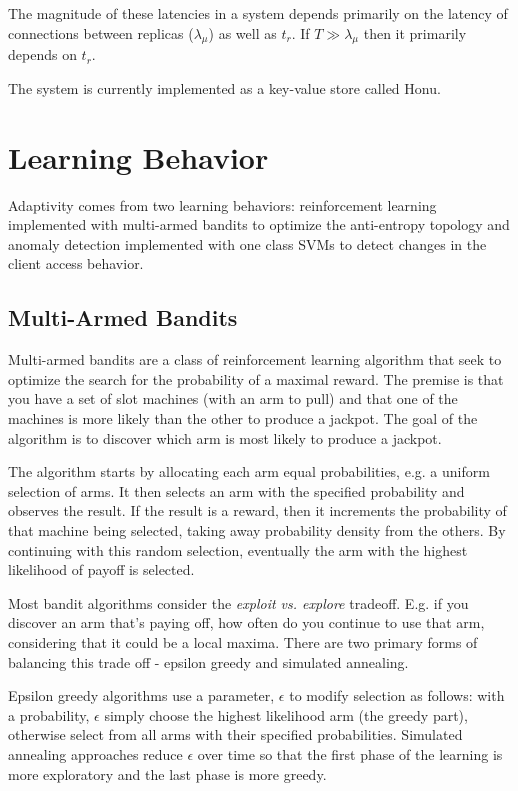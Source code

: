 \documentclass[letterpaper,11pt,onecolumn]{article}
\begin{document}
The magnitude of these latencies in a system depends primarily on the latency
of connections between replicas ($\lambda_\mu$) as well as
$t_r$. If $T \gg \lambda_\mu$ then it primarily depends on $t_r$.

The system is currently implemented as a key-value store called Honu.

\section*{Learning Behavior}

Adaptivity comes from two learning behaviors: reinforcement learning
implemented with multi-armed bandits to optimize the anti-entropy topology
and anomaly detection implemented with one class SVMs to detect changes in
the client access behavior.

\subsection*{Multi-Armed Bandits}

Multi-armed bandits are a class of reinforcement learning algorithm that seek
to optimize the search for the probability of a maximal reward.
The premise is that you have a set of slot machines (with an arm to pull) and
that one of the machines is more likely than the other to produce a jackpot.
The goal of the algorithm is to discover which arm is most likely to produce
a jackpot.

The algorithm starts by allocating each arm equal probabilities, e.g. a
uniform selection of arms.
It then selects an arm with the specified probability and observes the
result.
If the result is a reward, then it increments the probability of that machine
being selected, taking away probability density from the others.
By continuing with this random selection, eventually the arm with the highest
likelihood of payoff is selected.

Most bandit algorithms consider the \emph{exploit vs. explore} tradeoff.
E.g. if you discover an arm that's paying off, how often do you continue to
use that arm, considering that it could be a local maxima. There are two
primary forms of balancing this trade off - epsilon greedy and simulated
annealing.

Epsilon greedy algorithms use a parameter, $\epsilon$ to modify selection as
follows: with a probability, $\epsilon$ simply choose the highest likelihood
arm (the greedy part), otherwise select from all arms with their specified
probabilities. Simulated annealing approaches reduce $\epsilon$ over time so
that the first phase of the learning is more exploratory and the last phase
is more greedy.
\end{document}
